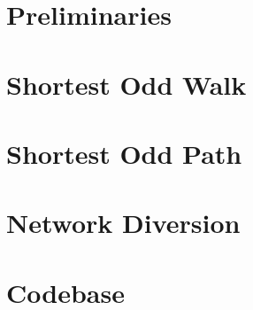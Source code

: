 \documentclass[12pt,oneside,final,a4paper]{report}
\theoremstyle{definition}
\begin{document}




\setcounter{page}{1}
\setlength{\parskip}{0.5cm plus4mm minus3mm}  



\chapter{Preliminaries}




\chapter{Shortest Odd Walk}
\label{odd-walk}




\chapter{Shortest Odd Path}





\chapter{Network Diversion}
\label{network-diversion}





\chapter{Codebase}





\end{document}
